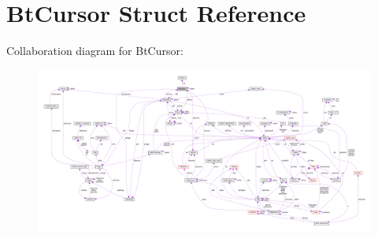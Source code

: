 \hypertarget{structBtCursor}{}\section{Bt\+Cursor Struct Reference}
\label{structBtCursor}


Collaboration diagram for Bt\+Cursor\+:\nopagebreak
\begin{figure}[H]
\begin{center}
\leavevmode
\includegraphics[width=350pt]{structBtCursor__coll__graph}
\end{center}
\end{figure}
